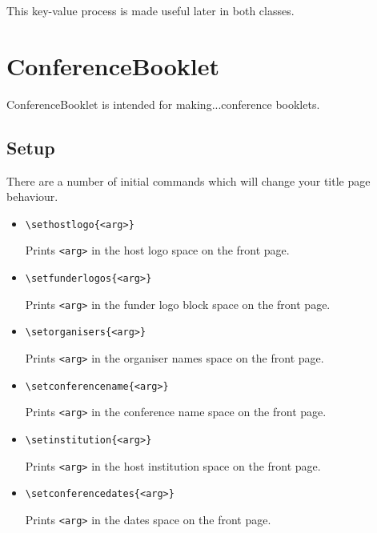 \documentclass{amsart}
\begin{document}
This key-value process is made useful later in both classes.

\section{ConferenceBooklet}
ConferenceBooklet is intended for making...conference booklets.
\subsection{Setup}
There are a number of initial commands which will change your title page behaviour.
\begin{itemize}
    \item \verb|\sethostlogo{<arg>}|

    Prints \verb|<arg>| in the host logo space on the front page.
    \item \verb|\setfunderlogos{<arg>}|

    Prints \verb|<arg>| in the funder logo block space on the front page.
    \item \verb|\setorganisers{<arg>}|

    Prints \verb|<arg>| in the organiser names space on the front page.
    \item \verb|\setconferencename{<arg>}|

    Prints \verb|<arg>| in the conference name space on the front page.
    \item \verb|\setinstitution{<arg>}|

    Prints \verb|<arg>| in the host institution space on the front page.
    \item \verb|\setconferencedates{<arg>}|

    Prints \verb|<arg>| in the dates space on the front page.
\end{itemize}
\end{document}
